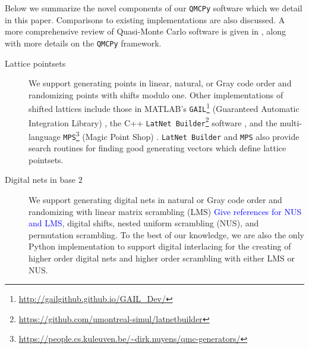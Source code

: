 \documentclass[acmsmall]{acmart}
\newcommand{\FJHNote}[1]{\textcolor{blue}{#1}}
\begin{document}
Below we summarize the novel components of our \texttt{QMCPy} software which we detail in this paper. Comparisons to existing implementations are also discussed. A more comprehensive review of Quasi-Monte Carlo software is given in \citep{choi.QMC_software}, along with more details on the \texttt{QMCPy} framework. 
\begin{description}
    \item[Lattice pointsets] We support generating points in linear, natural, or Gray code order and randomizing points with shifts modulo one. Other implementations of shifted lattices include those in MATLAB's \texttt{GAIL}\footnote{\url{http://gailgithub.github.io/GAIL_Dev/}} (Guaranteed Automatic Integration Library) \citep{GAIL.software,hickernell2018monte}, the C++ \texttt{LatNet Builder}\footnote{\url{https://github.com/umontreal-simul/latnetbuilder}} software \citep{LatNetBuilder.software}, and the multi-language \texttt{MPS}\footnote{\url{https://people.cs.kuleuven.be/~dirk.nuyens/qmc-generators/}} (Magic Point Shop) \citep{MagicPointShop.software}. \texttt{LatNet Builder} and \texttt{MPS} also provide search routines for finding good generating vectors which define lattice pointsets.
    \item[Digital nets in base $2$] We support generating digital nets in natural or Gray code order and randomizing with linear matrix scrambling (LMS) \FJHNote{Give references for NUS and LMS}, digital shifts, nested uniform scrambling (NUS), and permutation scrambling. To the best of our knowledge, we are also the only Python implementation to support digital interlacing for the creating of higher order digital nets and higher order scrambling with either LMS or NUS. 
    

\end{description}
\end{document}

